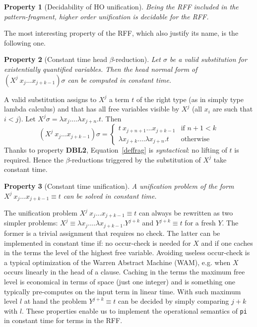 \documentclass{llncs}
\newtheorem{myprop}{Property}
\begin{document}
\begin{myprop}[Decidability of HO unification]
Being the RFF included in the pattern-fragment, higher order unification is
decidable for the RFF.
\end{myprop}

The most interesting property of the RFF, which also justify its name, is the
following one. 

\begin{myprop}[Constant time head $\beta$-reduction]
Let $\sigma$ be a \emph{valid} substitution for existentially quantified variables.  Then the head normal form of $(X^j~x_j \ldots x_{j+k-1}) \sigma$
can be computed in constant time.
\end{myprop}

A valid substitution assigns to $X^j$ a term $t$ of the right type (as in simply
type lambda calculus) and that has all free variables visible by $X^j$ (all
$x_i$ are such that $i < j$).  
Let $X^j \sigma = \lambda x_j. \ldots \lambda x_{j+n}.t$. Then
\begin{equation}\label{deffrag}(X^j~x_j \ldots x_{j+k-1}) \sigma
 = \left\{ \begin{array}{ll}
t~x_{j+n+1} \ldots x_{j+k-1} & \mbox{if $n+1 < k$} \\
\lambda x_{j+k}. \ldots \lambda x_{j+n}.t & \mbox{otherwise}
      \end{array} \right.\end{equation}
Thanks to property \textbf{DBL2}, Equation~\ref{deffrag} is
\emph{syntactical}: no lifting of $t$ is required.
Hence the $\beta$-reductions triggered by the substitution of $X^j$ take
constant time.

\begin{myprop}[Constant time unification]
A unification problem of the form  $X^j~x_j\ldots x_{j+k-1} \equiv t$
can be solved in constant time.
\end{myprop}

The unification problem $X^j~x_j\ldots x_{j+k-1} \equiv t$ can always be
rewritten as two simpler problems: $X^j \equiv \lambda x_j. \ldots \lambda x_{j+k-1}. Y^{j+k}$ and $Y^{j+k} \equiv t$ for a fresh $Y$.
The former is a trivial assignment that requires no check.
The latter can be implemented in constant time if: no occur-check is needed
for $X$ and if one caches in the terms the level of the highest free variable.
Avoiding useless occur-check is a typical optimization of the Warren Abstract
Machine (WAM), e.g. when $X$ occurs linearly in the head of a clause.
Caching in the terms the maximum free level is economical in terms of space
(just one integer) and is something one typically pre-computes on the input
term in linear time.  With such maximum level $l$ at hand the problem $Y^{j+k}
\equiv t$ can be decided by simply comparing $j+k$ with $l$.
These properties enable us to implement the operational semantics of \verb+pi+
in constant time for terms in the RFF.
\end{document}
